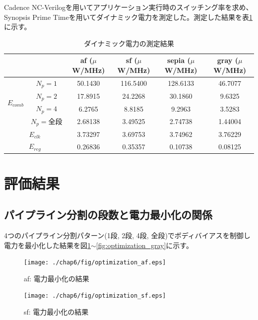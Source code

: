 {Cadence NC-Verilogを用いてアプリケーション実行時のスイッチング率を求め、Synopsis Prime Timeを用いてダイナミック電力を測定した。測定した結果を表\ref{table:result_dynamic}に示す。

\begin{table}[h]
\centering
\caption{ダイナミック電力の測定結果}
\label{table:result_dynamic}
\begin{tabular}{|c|c|c|c|c|c|} \hline
\multicolumn{2}{|c|}{} & af ($\mu$W/MHz) & sf ($\mu$W/MHz) & sepia ($\mu$W/MHz) & gray ($\mu$W/MHz) \\ \hline \hline
\multirow{4}{*}{$E_{comb}$} & $N_p = 1$ & 50.1430  &  116.5400   & 128.6133  & 46.7077  \\ \cline{2-6} 
							& $N_p = 2$ & 17.8915  & 24.2268   & 30.1860  & 9.6325  \\ \cline{2-6} 
							& $N_p = 4$ & 6.2765  &  8.8185  & 9.2963  & 3.5283  \\ \cline{2-6} 
							& $N_p = 全段$ & 2.68138  & 3.49525  & 2.74738  & 1.44004  \\ \hline
		\multicolumn{2}{|c|}{$E_{clk}$} & 3.73297  & 3.69753  & 3.74962  & 3.76229  \\ \hline
		\multicolumn{2}{|c|}{$E_{reg}$} & 0.26836  & 0.35357  & 0.10738  & 0.08125 \\ \hline
\end{tabular}
\end{table}

\section{評価結果}
\subsection{パイプライン分割の段数と電力最小化の関係}
\label{subsec:stage_vs_power}
4つのパイプライン分割パターン(1段, 2段, 4段, 全段)でボディバイアスを制御し電力を最小化した結果を図\ref{fig:optimization_af}$\sim$\ref{fig:optimization_gray}に示す。

\begin{figure}[h]
\centering
\texttt{[image: ./chap6/fig/optimization\_af.eps]}
\caption{af: 電力最小化の結果}
\label{fig:optimization_af}
\end{figure}


\begin{figure}[h]
\centering
\texttt{[image: ./chap6/fig/optimization\_sf.eps]}
\caption{sf: 電力最小化の結果}
\label{fig:optimization_sf}
\end{figure}


}
